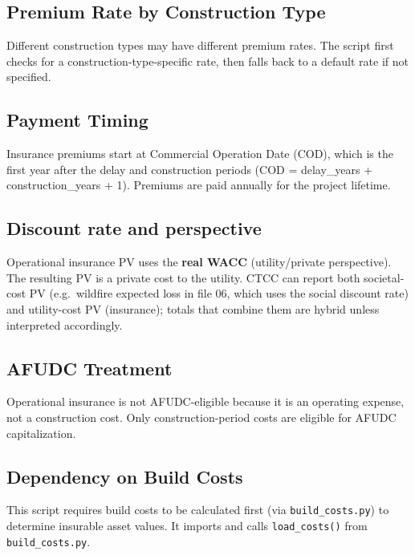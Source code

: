 \documentclass[ctcc_full_documentation.tex]{subfiles}
\begin{document}
\subsection{Premium Rate by Construction Type}

Different construction types may have different premium rates. The script first checks for a construction-type-specific rate, then falls back to a default rate if not specified.

\subsection{Payment Timing}

Insurance premiums start at Commercial Operation Date (COD), which is the first year after the delay and construction periods (COD = delay\_years + construction\_years + 1). Premiums are paid annually for the project lifetime.

\subsection{Discount rate and perspective}

Operational insurance PV uses the \textbf{real WACC} (utility/private perspective). The resulting PV is a private cost to the utility. CTCC can report both societal-cost PV (e.g.\ wildfire expected loss in file 06, which uses the social discount rate) and utility-cost PV (insurance); totals that combine them are hybrid unless interpreted accordingly.

\subsection{AFUDC Treatment}

Operational insurance is not AFUDC-eligible because it is an operating expense, not a construction cost. Only construction-period costs are eligible for AFUDC capitalization.

\subsection{Dependency on Build Costs}

This script requires build costs to be calculated first (via \texttt{build\_costs.py}) to determine insurable asset values. It imports and calls \texttt{load\_costs()} from \texttt{build\_costs.py}.
\end{document}
